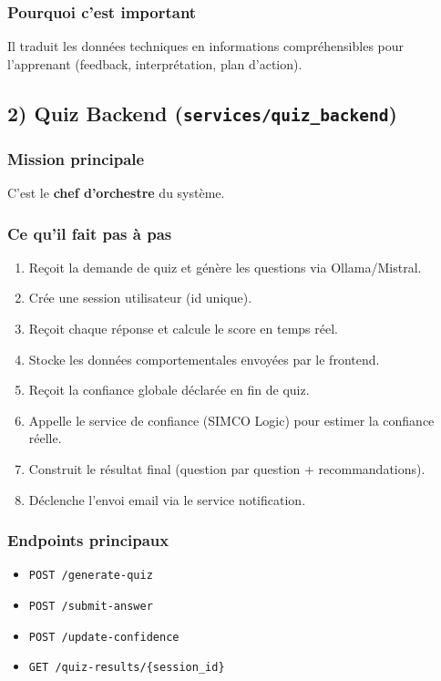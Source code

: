 \documentclass[12pt,a4paper]{article}
\begin{document}
\subsubsection{Pourquoi c'est important}
Il traduit les donn\'ees techniques en informations compr\'ehensibles pour l'apprenant (feedback, interpr\'etation, plan d'action).

\subsection{2) Quiz Backend (\texttt{services/quiz\_backend})}
\subsubsection{Mission principale}
C'est le \textbf{chef d'orchestre} du syst\`eme.

\subsubsection{Ce qu'il fait pas \`a pas}
\begin{enumerate}
    \item Re\c{c}oit la demande de quiz et g\'en\`ere les questions via Ollama/Mistral.
    \item Cr\'ee une session utilisateur (id unique).
    \item Re\c{c}oit chaque r\'eponse et calcule le score en temps r\'eel.
    \item Stocke les donn\'ees comportementales envoy\'ees par le frontend.
    \item Re\c{c}oit la confiance globale d\'eclar\'ee en fin de quiz.
    \item Appelle le service de confiance (SIMCO Logic) pour estimer la confiance r\'eelle.
    \item Construit le r\'esultat final (question par question + recommandations).
    \item D\'eclenche l'envoi email via le service notification.
\end{enumerate}

\subsubsection{Endpoints principaux}
\begin{itemize}
    \item \texttt{POST /generate-quiz}
    \item \texttt{POST /submit-answer}
    \item \texttt{POST /update-confidence}
    \item \texttt{GET /quiz-results/\{session\_id\}}
\end{itemize}
\end{document}

